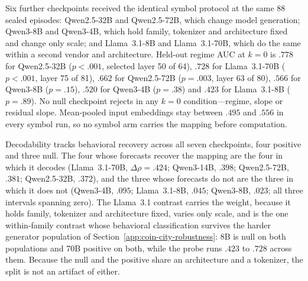 Six further checkpoints received the identical symbol protocol at the same 88
sealed episodes: Qwen2.5-32B and Qwen2.5-72B, which change model generation;
Qwen3-8B and Qwen3-4B, which hold family, tokenizer and architecture fixed and
change only scale; and Llama~3.1-8B and Llama~3.1-70B, which do the same within a
second vendor and architecture. Held-out regime AUC at $k=0$ is $.778$ for
Qwen2.5-32B ($p<.001$, selected layer 50 of 64), $.728$ for Llama~3.1-70B
($p<.001$, layer 75 of 81), $.662$ for Qwen2.5-72B ($p=.003$, layer 63 of 80),
$.566$ for Qwen3-8B ($p=.15$), $.520$ for Qwen3-4B ($p=.38$) and $.423$ for
Llama~3.1-8B ($p=.89$). No null checkpoint rejects in any $k=0$
condition---regime, slope or residual slope. Mean-pooled input embeddings stay
between $.495$ and $.556$ in every symbol run, so no symbol arm carries the
mapping before computation.

Decodability tracks behavioral recovery across all seven checkpoints, four
positive and three null. The four whose forecasts recover the mapping are the four
in which it decodes (Llama~3.1-70B, $\Delta\rho=.424$; Qwen3-14B, $.398$;
Qwen2.5-72B, $.381$; Qwen2.5-32B, $.372$), and the three whose forecasts do not
are the three in which it does not (Qwen3-4B, $.095$; Llama~3.1-8B, $.045$;
Qwen3-8B, $.023$; all three intervals spanning zero). The Llama~3.1
contrast carries the weight, because it holds family, tokenizer and architecture
fixed, varies only scale, and is the one within-family contrast whose behavioral
classification survives the harder generator population of
Section~\ref{app:coin-city-robustness}: 8B is null on both populations and 70B
positive on both, while the probe runs $.423$ to $.728$ across them. Because the
null and the positive share an architecture and a tokenizer, the split is not an
artifact of either.

